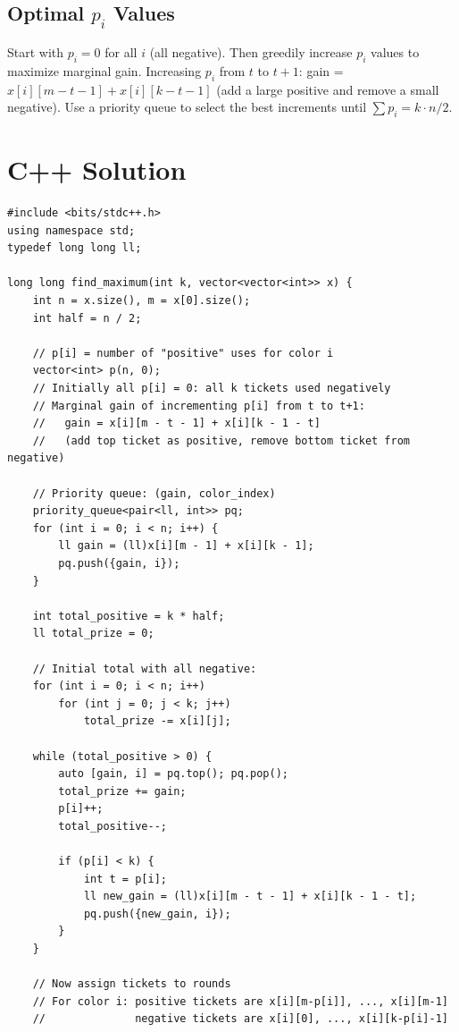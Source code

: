 \documentclass[11pt,a4paper]{article}
\begin{document}
\subsection{Optimal $p_i$ Values}
Start with $p_i = 0$ for all $i$ (all negative). Then greedily increase $p_i$ values to maximize marginal gain. Increasing $p_i$ from $t$ to $t+1$: gain = $x[i][m-t-1] + x[i][k-t-1]$ (add a large positive and remove a small negative). Use a priority queue to select the best increments until $\sum p_i = k \cdot n/2$.

\section{C++ Solution}

\begin{lstlisting}
#include <bits/stdc++.h>
using namespace std;
typedef long long ll;

long long find_maximum(int k, vector<vector<int>> x) {
    int n = x.size(), m = x[0].size();
    int half = n / 2;

    // p[i] = number of "positive" uses for color i
    vector<int> p(n, 0);
    // Initially all p[i] = 0: all k tickets used negatively
    // Marginal gain of incrementing p[i] from t to t+1:
    //   gain = x[i][m - t - 1] + x[i][k - 1 - t]
    //   (add top ticket as positive, remove bottom ticket from negative)

    // Priority queue: (gain, color_index)
    priority_queue<pair<ll, int>> pq;
    for (int i = 0; i < n; i++) {
        ll gain = (ll)x[i][m - 1] + x[i][k - 1];
        pq.push({gain, i});
    }

    int total_positive = k * half;
    ll total_prize = 0;

    // Initial total with all negative:
    for (int i = 0; i < n; i++)
        for (int j = 0; j < k; j++)
            total_prize -= x[i][j];

    while (total_positive > 0) {
        auto [gain, i] = pq.top(); pq.pop();
        total_prize += gain;
        p[i]++;
        total_positive--;

        if (p[i] < k) {
            int t = p[i];
            ll new_gain = (ll)x[i][m - t - 1] + x[i][k - 1 - t];
            pq.push({new_gain, i});
        }
    }

    // Now assign tickets to rounds
    // For color i: positive tickets are x[i][m-p[i]], ..., x[i][m-1]
    //              negative tickets are x[i][0], ..., x[i][k-p[i]-1]


\end{lstlisting}
\end{document}
